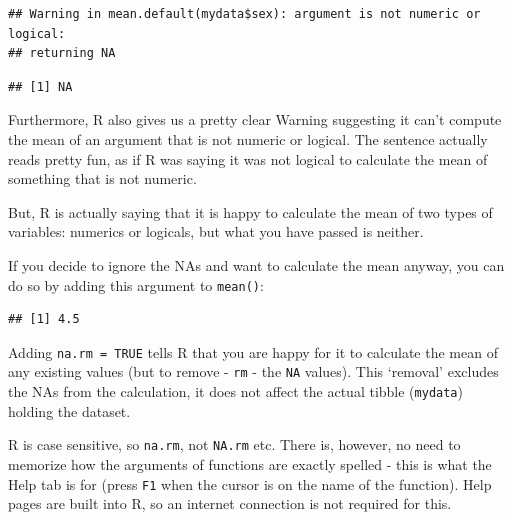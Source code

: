 \documentclass[
  12pt,
  krantz2]{krantz}
\makeatletter
\newenvironment{Shaded}{\begin{snugshade}}{\end{snugshade}}
\newcommand{\DataTypeTok}[1]{\textcolor[rgb]{0.13,0.29,0.53}{#1}}
\newcommand{\KeywordTok}[1]{\textcolor[rgb]{0.13,0.29,0.53}{\textbf{#1}}}
\newcommand{\NormalTok}[1]{#1}
\newcommand{\OperatorTok}[1]{\textcolor[rgb]{0.81,0.36,0.00}{\textbf{#1}}}
\newcommand{\OtherTok}[1]{\textcolor[rgb]{0.56,0.35,0.01}{#1}}
\newenvironment{kframe}{%
\medskip{}
\setlength{\fboxsep}{.8em}
 \def\at@end@of@kframe{}%
 \ifinner\ifhmode%
  \def\at@end@of@kframe{\end{minipage}}%
  \begin{minipage}{\columnwidth}%
 \fi\fi%
 \def\FrameCommand##1{\hskip\@totalleftmargin \hskip-\fboxsep
 \colorbox{shadecolor}{##1}\hskip-\fboxsep
     \hskip-\linewidth \hskip-\@totalleftmargin \hskip\columnwidth}%
 \MakeFramed {\advance\hsize-\width
   \@totalleftmargin\z@ \linewidth\hsize
   \@setminipage}}%
 {\par\unskip\endMakeFramed%
 \at@end@of@kframe}
\renewenvironment{Shaded}{\begin{kframe}}{\end{kframe}}
\makeatother
\begin{document}
\begin{Shaded}
\end{Shaded}

\begin{verbatim}
## Warning in mean.default(mydata$sex): argument is not numeric or logical:
## returning NA
\end{verbatim}

\begin{verbatim}
## [1] NA
\end{verbatim}

Furthermore, R also gives us a pretty clear Warning suggesting it can't compute the mean of an argument that is not numeric or logical.
The sentence actually reads pretty fun, as if R was saying it was not logical to calculate the mean of something that is not numeric.

But, R is actually saying that it is happy to calculate the mean of two types of variables: numerics or logicals, but what you have passed is neither.

If you decide to ignore the NAs and want to calculate the mean anyway, you can do so by adding this argument to \texttt{mean()}:


\begin{Shaded}
\end{Shaded}

\begin{verbatim}
## [1] 4.5
\end{verbatim}

Adding \texttt{na.rm\ =\ TRUE} tells R that you are happy for it to calculate the mean of any existing values (but to remove - \texttt{rm} - the \texttt{NA} values).
This `removal' excludes the NAs from the calculation, it does not affect the actual tibble (\texttt{mydata}) holding the dataset.

R is case sensitive, so \texttt{na.rm}, not \texttt{NA.rm} etc.
There is, however, no need to memorize how the arguments of functions are exactly spelled - this is what the Help tab is for (press \texttt{F1} when the cursor is on the name of the function).
Help pages are built into R, so an internet connection is not required for this.
\end{document}
